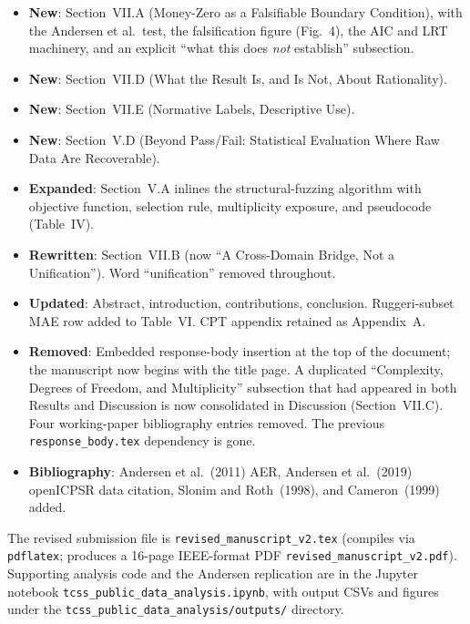 \documentclass[11pt]{article}
\begin{document}
\begin{itemize}[leftmargin=*]
  \item \textbf{New}: Section~VII.A (Money-Zero as a Falsifiable Boundary Condition), with
        the Andersen et al.\ test, the falsification figure (Fig.~4), the AIC and
        LRT machinery, and an explicit ``what this does \emph{not} establish'' subsection.
  \item \textbf{New}: Section~VII.D (What the Result Is, and Is Not, About Rationality).
  \item \textbf{New}: Section~VII.E (Normative Labels, Descriptive Use).
  \item \textbf{New}: Section~V.D (Beyond Pass/Fail: Statistical Evaluation Where Raw
        Data Are Recoverable).
  \item \textbf{Expanded}: Section~V.A inlines the structural-fuzzing algorithm with
        objective function, selection rule, multiplicity exposure, and pseudocode
        (Table~IV).
  \item \textbf{Rewritten}: Section~VII.B (now ``A Cross-Domain Bridge, Not a
        Unification''). Word ``unification'' removed throughout.
  \item \textbf{Updated}: Abstract, introduction, contributions, conclusion. Ruggeri-subset MAE row added to Table~VI. CPT appendix retained as Appendix~A.
  \item \textbf{Removed}: Embedded response-body insertion at the top of the document;
        the manuscript now begins with the title page. A duplicated ``Complexity,
        Degrees of Freedom, and Multiplicity'' subsection that had appeared in both
        Results and Discussion is now consolidated in Discussion (Section~VII.C). Four
        working-paper bibliography entries removed. The previous \texttt{response\_body.tex}
        dependency is gone.
  \item \textbf{Bibliography}: Andersen et al.~(2011) AER, Andersen et al.\ (2019) openICPSR
        data citation, Slonim and Roth~(1998), and Cameron~(1999) added.
\end{itemize}

The revised submission file is \texttt{revised\_manuscript\_v2.tex} (compiles via
\texttt{pdflatex}; produces a 16-page IEEE-format PDF \texttt{revised\_manuscript\_v2.pdf}).
Supporting analysis code and the Andersen replication are in the Jupyter notebook
\texttt{tcss\_public\_data\_analysis.ipynb}, with output CSVs and figures under the
\texttt{tcss\_public\_data\_analysis/outputs/} directory.
\end{document}

